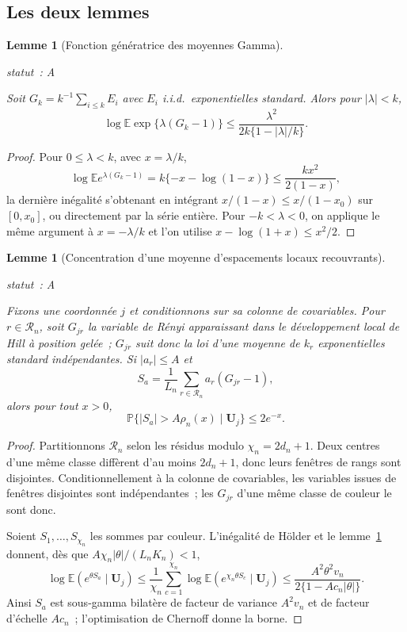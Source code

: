 \documentclass[11pt]{article}
\theoremstyle{plain}
\newtheorem{lemme}[theoreme]{Lemme}
\theoremstyle{definition}
\theoremstyle{remark}
\newcommand{\Pp}{\mathbb P}
\newcommand{\E}{\mathbb E}
\newcommand{\1}{\mathbf 1}
\newcommand{\statut}[1]{%
  \nopagebreak\par\nopagebreak
  \hfill{\normalfont\footnotesize\textcolor{gris}{statut~: #1}}%
  \par\nopagebreak\vspace{-2pt}}
\begin{document}
\subsection{Les deux lemmes}

\begin{lemme}[Fonction génératrice des moyennes Gamma]
\label{lem:gamma}
\statut{A}
Soit $G_k=k^{-1}\sum_{i\le k}E_i$ avec $E_i$ i.i.d.\ exponentielles
standard. Alors pour $|\lambda|<k$,
\[
 \log\E\exp\{\lambda(G_k-1)\}\le\frac{\lambda^2}{2k\{1-|\lambda|/k\}} .
\]
\end{lemme}

\begin{proof}
Pour $0\le\lambda<k$, avec $x=\lambda/k$,
\[
 \log\E e^{\lambda(G_k-1)}=k\{-x-\log(1-x)\}\le\frac{kx^2}{2(1-x)},
\]
la dernière inégalité s'obtenant en intégrant $x/(1-x)\le x/(1-x_0)$ sur
$[0,x_0]$, ou directement par la série entière. Pour $-k<\lambda<0$, on
applique le même argument à $x=-\lambda/k$ et l'on utilise
$x-\log(1+x)\le x^2/2$.
\end{proof}

\begin{lemme}[Concentration d'une moyenne d'espacements locaux recouvrants]
\label{lem:coloriage}
\statut{A}
Fixons une coordonnée $j$ et conditionnons sur sa colonne de covariables.
Pour $r\in\mathcal R_n$, soit $G_{jr}$ la variable de Rényi apparaissant
dans le développement local de Hill à position gelée~; $G_{jr}$ suit donc
la loi d'une moyenne de $k_r$ exponentielles standard indépendantes. Si
$|a_r|\le A$ et
\[
 S_a=\frac1{L_n}\sum_{r\in\mathcal R_n}a_r(G_{jr}-1),
\]
alors pour tout $x>0$,
\[
 \Pp\{|S_a|>A\rho_n(x)\mid\bm U_j\}\le2e^{-x} .
\]
\end{lemme}

\begin{proof}
Partitionnons $\mathcal R_n$ selon les résidus modulo $\chi_n=2d_n+1$.
Deux centres d'une même classe diffèrent d'au moins $2d_n+1$, donc leurs
fenêtres de rangs sont disjointes. Conditionnellement à la colonne de
covariables, les variables issues de fenêtres disjointes sont
indépendantes~; les $G_{jr}$ d'une même classe de couleur le sont donc.

Soient $S_1,\dots,S_{\chi_n}$ les sommes par couleur. L'inégalité de
Hölder et le lemme~\ref{lem:gamma} donnent, dès que
$A\chi_n|\theta|/(L_nK_n)<1$,
\[
 \log\E(e^{\theta S_a}\mid\bm U_j)
 \le\frac1{\chi_n}\sum_{c=1}^{\chi_n}\log\E(e^{\chi_n\theta S_c}\mid\bm U_j)
 \le\frac{A^2\theta^2v_n}{2\{1-Ac_n|\theta|\}} .
\]
Ainsi $S_a$ est sous-gamma bilatère de facteur de variance $A^2v_n$ et de
facteur d'échelle $Ac_n$~; l'optimisation de Chernoff donne la borne.
\end{proof}
\end{document}
